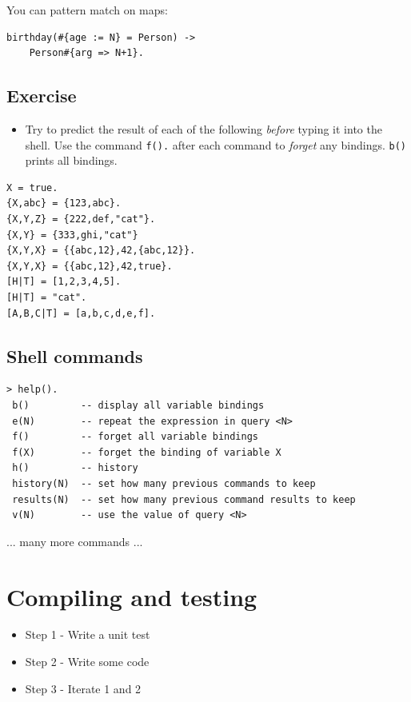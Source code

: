 \documentclass[12pt]{article}
\begin{document}
You can pattern match on maps:

\begin{verbatim}
birthday(#{age := N} = Person) ->
    Person#{arg => N+1}.
\end{verbatim}

\subsection{Exercise}
\begin{itemize}
\item Try to predict the result of each of the following {\sl before}
typing it into the shell. Use the command \verb+f().+ after each
command to {\sl forget} any bindings. \verb+b()+ prints all bindings.
\end{itemize}

\begin{verbatim}
X = true.
{X,abc} = {123,abc}.
{X,Y,Z} = {222,def,"cat"}.
{X,Y} = {333,ghi,"cat"}
{X,Y,X} = {{abc,12},42,{abc,12}}.
{X,Y,X} = {{abc,12},42,true}.
[H|T] = [1,2,3,4,5].
[H|T] = "cat".
[A,B,C|T] = [a,b,c,d,e,f].
\end{verbatim}


\subsection{Shell commands}
\begin{verbatim}
> help().
 b()         -- display all variable bindings        
 e(N)        -- repeat the expression in query <N>   
 f()         -- forget all variable bindings         
 f(X)        -- forget the binding of variable X     
 h()         -- history                              
 history(N)  -- set how many previous commands to keep 
 results(N)  -- set how many previous command results to keep
 v(N)        -- use the value of query <N>                   
\end{verbatim}

...  many more commands ...

\section{Compiling and testing}

\begin{itemize}
\item Step 1 - Write a unit test
\item Step 2 - Write some code
\item Step 3 - Iterate 1 and 2
\end{itemize}
\end{document}
